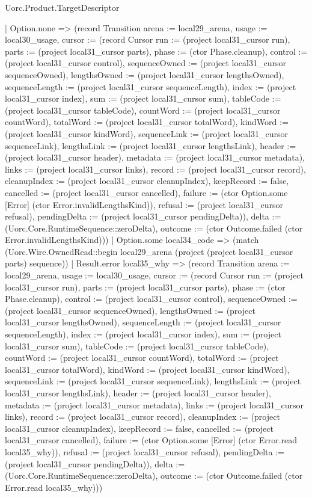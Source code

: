 \begin{lexlean}{Uorc.Product.TargetDescriptor}
\begin{semanticmodule}
{      | Option.none => (record Transition {arena := local29_arena, usage := local30_usage, cursor := (record Cursor {run := (project local31_cursor run), parts := (project local31_cursor parts), phase := (ctor Phase.cleanup), control := (project local31_cursor control), sequenceOwned := (project local31_cursor sequenceOwned), lengthsOwned := (project local31_cursor lengthsOwned), sequenceLength := (project local31_cursor sequenceLength), index := (project local31_cursor index), sum := (project local31_cursor sum), tableCode := (project local31_cursor tableCode), countWord := (project local31_cursor countWord), totalWord := (project local31_cursor totalWord), kindWord := (project local31_cursor kindWord), sequenceLink := (project local31_cursor sequenceLink), lengthsLink := (project local31_cursor lengthsLink), header := (project local31_cursor header), metadata := (project local31_cursor metadata), links := (project local31_cursor links), record := (project local31_cursor record), cleanupIndex := (project local31_cursor cleanupIndex), keepRecord := false, cancelled := (project local31_cursor cancelled), failure := (ctor Option.some [Error] (ctor Error.invalidLengthsKind)), refusal := (project local31_cursor refusal), pendingDelta := (project local31_cursor pendingDelta)}), delta := (Uorc.Core.RuntimeSequence::zeroDelta), outcome := (ctor Outcome.failed (ctor Error.invalidLengthsKind))})
      | Option.some local34_code => (match (Uorc.Wire.OwnedRead::begin local29_arena (project (project local31_cursor parts) sequence))
        | Result.error local35_why => (record Transition {arena := local29_arena, usage := local30_usage, cursor := (record Cursor {run := (project local31_cursor run), parts := (project local31_cursor parts), phase := (ctor Phase.cleanup), control := (project local31_cursor control), sequenceOwned := (project local31_cursor sequenceOwned), lengthsOwned := (project local31_cursor lengthsOwned), sequenceLength := (project local31_cursor sequenceLength), index := (project local31_cursor index), sum := (project local31_cursor sum), tableCode := (project local31_cursor tableCode), countWord := (project local31_cursor countWord), totalWord := (project local31_cursor totalWord), kindWord := (project local31_cursor kindWord), sequenceLink := (project local31_cursor sequenceLink), lengthsLink := (project local31_cursor lengthsLink), header := (project local31_cursor header), metadata := (project local31_cursor metadata), links := (project local31_cursor links), record := (project local31_cursor record), cleanupIndex := (project local31_cursor cleanupIndex), keepRecord := false, cancelled := (project local31_cursor cancelled), failure := (ctor Option.some [Error] (ctor Error.read local35_why)), refusal := (project local31_cursor refusal), pendingDelta := (project local31_cursor pendingDelta)}), delta := (Uorc.Core.RuntimeSequence::zeroDelta), outcome := (ctor Outcome.failed (ctor Error.read local35_why))})
}
\end{semanticmodule}
\end{lexlean}
